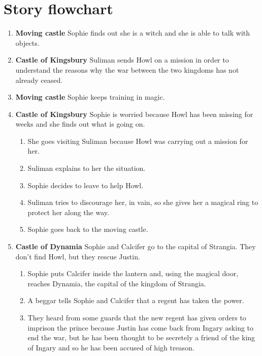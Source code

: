 \section{Story flowchart}

\begin{enumerate}
\item \textbf{Moving castle} Sophie finds out she is a witch and she is able to talk with objects.
  
\item \textbf{Castle of Kingsbury} Suliman sends Howl on a mission in order to understand the reasons why the war between the two kingdoms has not already ceased.
  
\item \textbf{Moving castle} Sophie keeps training in magic.
  
\item \textbf{Castle of Kingsbury} Sophie is worried because Howl has been missing for weeks and she finds out what is going on.
  \begin{enumerate}
  \item She goes visiting Suliman because Howl was carrying out a mission for her.
    
  \item Suliman explains to her the situation.

  \item Sophie decides to leave to help Howl.

  \item Suliman tries to discourage her, in vain, so she gives her a magical ring to protect her along the way.

  \item Sophie goes back to the moving castle.
  \end{enumerate}

\item \textbf{Castle of Dynamia} Sophie and Calcifer go to the capital of Strangia. They don’t find Howl, but they rescue Justin.

  \begin{enumerate}
  \item Sophie puts Calcifer inside the lantern and, using the magical door, reaches Dynamia, the capital of the kingdom of Strangia.
    
  \item A beggar tells Sophie and Calcifer that a regent has taken the power.
    
  \item They heard from some guards that the new regent has given orders to imprison the prince because Justin has come back from Ingary asking to end the war, but he has been thought to be secretely a friend of the king of Ingary and so he has been accused of high treason.
    

\end{enumerate}
\end{enumerate}
